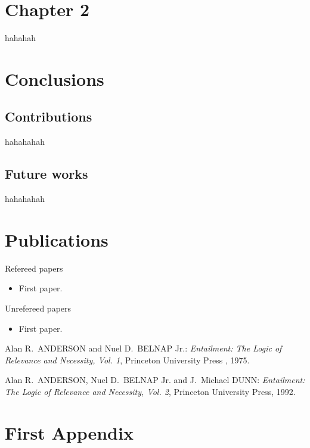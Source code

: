 \documentclass[12pt]{report}
\begin{document}
\chapter{Chapter 2} 
hahahah

\chapter{Conclusions} 
\section{Contributions}
hahahahah
\section{Future works}
hahahahah

\chapter*{Publications}

\begin{list}%
 {} %
 {} %
 \item Refereed papers
       \begin{itemize}
	\item First paper.
       \end{itemize}
 \item Unrefereed papers
       \begin{itemize}
	\item First paper.
       \end{itemize}
\end{list}


\begin{thebibliography}{10}

	Alan R.~ANDERSON and Nuel D.~BELNAP Jr.: {\em Entailment: The Logic of
	Relevance and Necessity, Vol. 1\/}, Princeton University Press
	, 1975.

	Alan R.~ANDERSON, Nuel D.~BELNAP Jr. and J.~Michael DUNN: {\em
	Entailment: The Logic of Relevance and Necessity, Vol. 2\/},
	Princeton University Press, 1992.

\end{thebibliography}

\appendix 
{}
\chapter{First Appendix}
\end{document}
